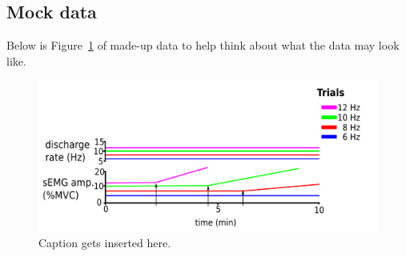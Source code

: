 \subsection{Mock data}
Below is Figure~\ref{fig:some_data} of made-up data to help think about what the data may look like. 

\begin{figure}[!htbp]
\centering
\includegraphics[scale=0.75]{./img/fake_data.png} 
\captionsetup{justification=centering}
\caption{Caption gets inserted here.}
\label{fig:some_data}
\end{figure}

\lipsum[1]